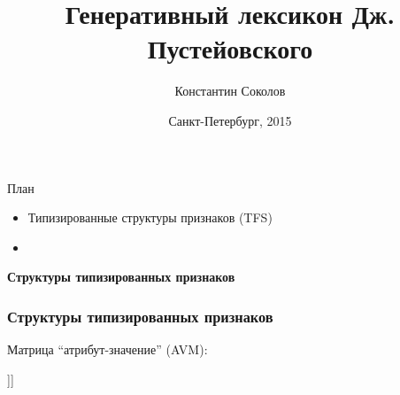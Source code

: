 \documentclass{beamer}
\begin{document}
\title{\Large{Генеративный лексикон Дж. Пустейовского}}
\author{Константин Соколов}
\date{Санкт-Петербург, 2015} 
\begin{frame}
    \thispagestyle{empty}
    \titlepage
\end{frame}

% 
% 
%
% 
%
\begin{frame}{План}
    \setcounter{framenumber}{1}
    \begin{itemize}
        \item Типизированные структуры признаков (TFS)
        \item 
    \end{itemize}
\end{frame}

\begin{frame}{}
\begin{center}
	\textbf{Структуры типизированных признаков}
\end{center}
\end{frame}

\begin{frame}[fragile]
\frametitle{Структуры типизированных признаков}
Матрица ``атрибут-значение'' (AVM):\\
\begin{center}
	\begin{avm}
	[{action} predicate & on \cr
    	      Mood & imp \cr 
        	  Actor & @{1} \cr 
	          Patient & [{thing} predicate & @{2} лампа \cr
    	                         Num & sg \cr 
        	                     Modifier & [{q-color} predicate & красный\_adj ]]]
	\end{avm}
\end{center}	
\end{frame}
\end{document}
